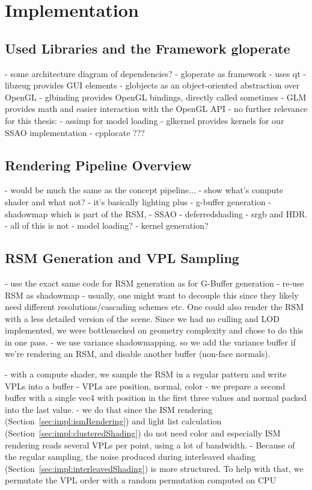 

\chapter{Implementation}

\section{Used Libraries and the Framework gloperate}


- some architecture diagram of dependencies?
- gloperate as framework
    - uses qt
- libzeug provides GUI elements
- globjects as an object-oriented abstraction over OpenGL
- glbinding provides OpenGL bindings, directly called sometimes
- GLM provides math and easier interaction with the OpenGL API
- no further relevance for this thesis:
    - assimp for model loading
    - glkernel provides kernels for our SSAO implementation
    - cpplocate ???

\section{Rendering Pipeline Overview}
- would be much the same as the concept pipeline...
- show what's compute shader and what not?
- it's basically lighting plus
    - g-buffer generation
    - shadowmap which is part of the RSM,
    - SSAO
    - deferredshading
    - srgb and HDR.
    - all of this is not
- model loading?
- kernel generation?


\section{RSM Generation and VPL Sampling}
\label{sec:impl:rsmAndVplSampling}
- use the exact same code for RSM generation as for G-Buffer generation
- re-use RSM as shadowmap
    - usually, one might want to decouple this since they likely need different resolutions/cascading schemes etc. One could also render the RSM with a less detailed version of the scene. Since we had no culling and LOD implemented, we were bottlenecked on geometry complexity and chose to do this in one pass.
    - we use variance shadowmapping. so we add the variance buffer if we're rendering an RSM, and disable another buffer (non-face normals).

- with a compute shader, we sample the RSM in a regular pattern and write VPLs into a buffer
- VPLs are position, normal, color
- we prepare a second buffer with a single vec4 with position in the first three values and normal packed into the last value.
- we do that since the ISM rendering (Section~\ref{sec:impl:ismRendering}) and light list calculation (Section~\ref{sec:impl:clusteredShading}) do not need color and especially ISM rendering reads several VPLs per point, using a lot of bandwidth.
- Because of the regular sampling, the noise produced during interleaved shading (Section~\ref{sec:impl:interleavedShading}) is more structured. To help with that, we permutate the VPL order with a random permutation computed on CPU

